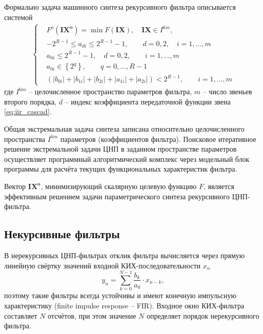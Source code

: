 \documentclass[a4paper,14pt]{extarticle}
\begin{document}
Формально задача машинного синтеза рекурсивного фильтра описывается системой
\begin{gather}
\left\{\begin{aligned}
  &F^{o}\left(\boldsymbol{I X}^{\boldsymbol{o}}\right)=
    \min F(\boldsymbol{I X}),  \quad
      \boldsymbol{I X} \in I^{6 m},\\
  &-2^{R-1} \leq a_{d i} \leq 2^{R-1}-1, \quad \quad d=0,2, \quad i=1,\ldots,m\\
  &a_{0 i} \leq 2^{R-1}-1, \quad d=0,2, \quad \quad i=1,\ldots,m\\
  &a_{0 i} \in\left\{2^{q}\right\}, \quad \quad q=0,\ldots,R-1\\
  &\left(\left|b_{0 i}\right|+\left|b_{1 i}\right|+\left|b_{2 i}\right|+\left|a_{1 i}\right|+\left|a_{2 i}\right|\right)<2^{R-1}, \quad \quad i=1,\ldots,m
\end{aligned}\right.
\end{gather}
где $I^{6m}$ -- целочисленное пространство параметров фильтра, $m$ -- число звеньев второго порядка, $d$ -- индекс коэффициента передаточной функции звена \eqref{eq:iir_cascad}.

Общая экстремальная задача синтеза записана относительно целочисленного пространства $I^{6m}$ параметров (коэффициентов фильтра). Поисковое итеративное решение экстремальной задачи ЦНП в заданном пространстве параметров осуществляет программный алгоритмический комплекс через
модельный блок программы для расчёта текущих функциональных характеристик фильтра. 

Вектор $\boldsymbol{I X}^{\boldsymbol{o}}$, минимизирующий скалярную
целевую функцию $F$, является эффективным решением задачи параметрического синтеза рекурсивного ЦНП-фильтра.

\subsection{Некурсивные фильтры}

В нерекурсивных ЦНП-фильтрах отклик фильтра  вычисляется через прямую линейную свёртку значений входной КИХ-последовательности $x_n$ 
\begin{equation}
  y_{n}=\sum_{k=0}^{N-1} \frac{b_{k}}{a_{0}} \cdot x_{n-k},
\end{equation}
поэтому такие фильтры всегда устойчивы и имеют конечную импульсную характеристику (finite impulse response -- FIR). Входное окно КИХ-фильтра составляет $N$ отсчётов, при этом значение $N$ определяет порядок нерекурсивного фильтра.
\end{document}
